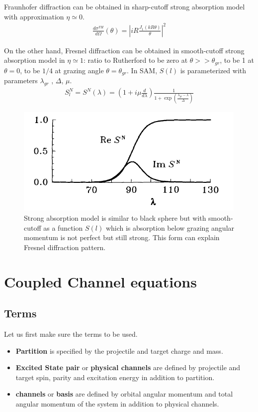 \documentclass[11pt]{book}
\newcommand{\bea}{\begin{eqnarray}}
\newcommand{\eea}{\end{eqnarray}}
\begin{document}
Fraunhofer diffraction can be obtained in sharp-cutoff strong absorption model with approximation $\eta\simeq 0$.
\bea 
\frac{d\sigma^{FH}}{d\Omega}(\theta)=|i R\frac{J_1(kR\theta)}{\theta}|^2
\eea 

On the other hand, Fresnel diffraction can be obtained in smooth-cutoff strong absorption model
in $\eta\simeq 1$: ratio to Rutherford  to be zero at $\theta>>\theta_{gr}$,
to be 1 at $\theta=0$, to be $1/4$ at grazing angle $\theta=\theta_{gr}$.  
In SAM, $S(l)$ is parameterized with parameters $\lambda_{gr}$ , $\Delta$, $\mu$. 
\bea 
S_l^N = S^N(\lambda) = (1+i\mu \frac{d}{d\lambda}) \frac{1}{1+\exp(\frac{\lambda_{gr}-\lambda}{\Delta})}
\eea 
\begin{figure}[h]
	\centering
	\includegraphics[width=0.4\linewidth]{figs/strong_absorption_model}
	\caption{Strong absorption model is similar to black sphere but with smooth-cutoff
	         as a function $S(l)$ which is absorption below grazing angular momentum
	         is not perfect but still strong. This form can explain Fresnel diffraction pattern.  }
	\label{fig:strongabsorptionmodel}
\end{figure}

\chapter{Coupled Channel equations} 

\section{Terms} 
Let us first make sure the terms to be used.
\begin{itemize}
	\item {\bf Partition} is specified by the projectile and target charge and mass. 
	\item {\bf Excited State pair} or {\bf physical channels} are defined by projectile and 
	      target spin, parity and excitation energy in addition to partition. 
	\item {\bf channels} or {\bf basis} are defined by orbital angular momentum and 
	      total angular momentum of the system in addition to physical channels.       
\end{itemize}
\end{document}
